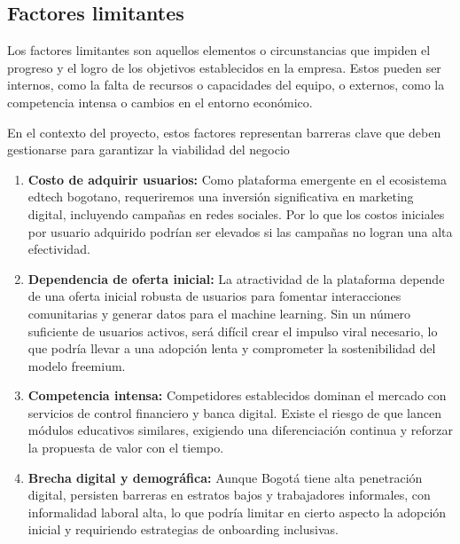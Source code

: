 {}
\subsection*{Factores limitantes}


Los factores limitantes son aquellos elementos o circunstancias que impiden el progreso y el logro de los objetivos establecidos en la empresa. Estos pueden ser internos, como la falta de recursos o capacidades del equipo, o externos, como la competencia intensa o cambios en el entorno económico. 

En el contexto del proyecto, estos factores representan barreras clave que deben gestionarse para garantizar la viabilidad del negocio

\begin{enumerate}
	\item \textbf{Costo de adquirir usuarios:} Como plataforma emergente en el ecosistema edtech bogotano, requeriremos una inversión significativa en marketing digital, incluyendo campañas en redes sociales. Por lo que los costos iniciales por usuario adquirido podrían ser elevados si las campañas no logran una alta efectividad.
	
	\item \textbf{Dependencia de oferta inicial:} La atractividad de la plataforma depende de una oferta inicial robusta de usuarios para fomentar interacciones comunitarias y generar datos para el machine learning. Sin un número suficiente de usuarios activos, será difícil crear el impulso viral necesario, lo que podría llevar a una adopción lenta y comprometer la sostenibilidad del modelo freemium.
	
	\item \textbf{Competencia intensa:} Competidores establecidos dominan el mercado con servicios de control financiero y banca digital. Existe el riesgo de que lancen módulos educativos similares, exigiendo una diferenciación continua y reforzar la propuesta de valor con el tiempo.
	
	\item \textbf{Brecha digital y demográfica:} Aunque Bogotá tiene alta penetración digital, persisten barreras en estratos bajos y trabajadores informales, con informalidad laboral alta, lo que podría limitar en cierto aspecto la adopción inicial y requiriendo estrategias de onboarding inclusivas.
\end{enumerate}